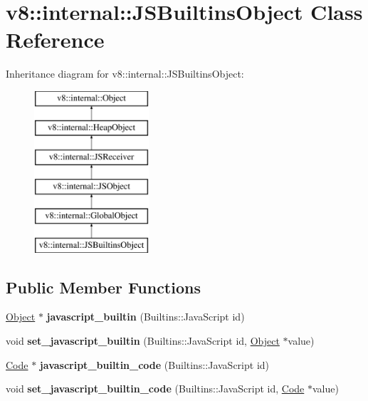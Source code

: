 \hypertarget{classv8_1_1internal_1_1_j_s_builtins_object}{}\section{v8\+:\+:internal\+:\+:J\+S\+Builtins\+Object Class Reference}
\label{classv8_1_1internal_1_1_j_s_builtins_object}
Inheritance diagram for v8\+:\+:internal\+:\+:J\+S\+Builtins\+Object\+:\begin{figure}[H]
\begin{center}
\leavevmode
\includegraphics[height=6.000000cm]{classv8_1_1internal_1_1_j_s_builtins_object}
\end{center}
\end{figure}
\subsection*{Public Member Functions}
\begin{DoxyCompactItemize}
\item 
\hypertarget{classv8_1_1internal_1_1_j_s_builtins_object_aed55c61110ed1057a70ae1ed24fe9cdd}{}\hyperlink{classv8_1_1internal_1_1_object}{Object} $\ast$ {\bfseries javascript\+\_\+builtin} (Builtins\+::\+Java\+Script id)\label{classv8_1_1internal_1_1_j_s_builtins_object_aed55c61110ed1057a70ae1ed24fe9cdd}

\item 
\hypertarget{classv8_1_1internal_1_1_j_s_builtins_object_a5d17a08f4029a1632a3a19fa18e56eea}{}void {\bfseries set\+\_\+javascript\+\_\+builtin} (Builtins\+::\+Java\+Script id, \hyperlink{classv8_1_1internal_1_1_object}{Object} $\ast$value)\label{classv8_1_1internal_1_1_j_s_builtins_object_a5d17a08f4029a1632a3a19fa18e56eea}

\item 
\hypertarget{classv8_1_1internal_1_1_j_s_builtins_object_ac91cd10d462320e8adaa6193f4d2a6b6}{}\hyperlink{classv8_1_1internal_1_1_code}{Code} $\ast$ {\bfseries javascript\+\_\+builtin\+\_\+code} (Builtins\+::\+Java\+Script id)\label{classv8_1_1internal_1_1_j_s_builtins_object_ac91cd10d462320e8adaa6193f4d2a6b6}

\item 
\hypertarget{classv8_1_1internal_1_1_j_s_builtins_object_a966ac61518f352fae7d4e067eb38d751}{}void {\bfseries set\+\_\+javascript\+\_\+builtin\+\_\+code} (Builtins\+::\+Java\+Script id, \hyperlink{classv8_1_1internal_1_1_code}{Code} $\ast$value)\label{classv8_1_1internal_1_1_j_s_builtins_object_a966ac61518f352fae7d4e067eb38d751}

\end{DoxyCompactItemize}

